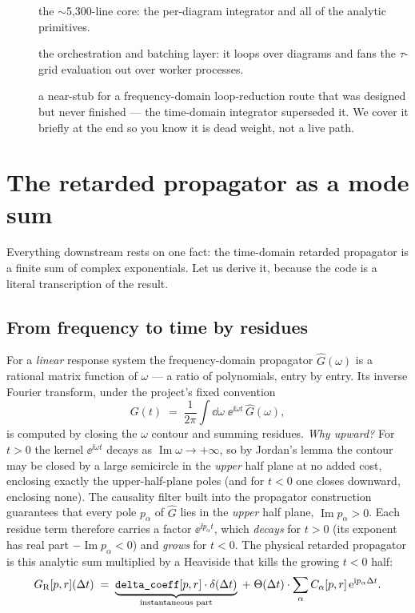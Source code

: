 \begin{description}
  \item[] the $\sim$5{,}300-line core: the per-diagram
        integrator and all of the analytic primitives.
  \item[] the orchestration and batching layer: it loops over
        diagrams and fans the $\tau$-grid evaluation out over worker processes.
  \item[] a near-stub for a frequency-domain loop-reduction
        route that was designed but never finished --- the time-domain integrator
        superseded it. We cover it briefly at the end so you know it is dead
        weight, not a live path.
\end{description}

\section{The retarded propagator as a mode sum}\label{sec:modesum}

Everything downstream rests on one fact: the time-domain retarded propagator is
a finite sum of complex exponentials. Let us derive it, because the code is a
literal transcription of the result.

\subsection{From frequency to time by residues}

For a \emph{linear} response system the frequency-domain propagator
$\widehat{G}(\omega)$ is a rational matrix function of $\omega$ --- a ratio of
polynomials, entry by entry. Its inverse Fourier transform, under the project's
fixed convention
\begin{equation}
  G(t) \;=\; \frac{1}{2\pi}\int \dd\omega \; \ee^{\ii \omega t}\,\widehat{G}(\omega),
  \label{eq:fourier-convention}
\end{equation}
is computed by closing the $\omega$ contour and summing residues. \emph{Why
upward?} For $t>0$ the kernel $\ee^{\ii\omega t}$ decays as
$\operatorname{Im}\omega\to+\infty$, so by Jordan's lemma the contour may be
closed by a large semicircle in the \emph{upper} half plane at no added cost,
enclosing exactly the upper-half-plane poles (and for $t<0$ one closes downward,
enclosing none). The causality
filter built into the propagator construction guarantees that every pole
$p_\alpha$ of $\widehat{G}$ lies in the \emph{upper} half plane,
$\operatorname{Im} p_\alpha > 0$. Each residue term therefore carries a factor
$\ee^{\ii p_\alpha t}$, which \emph{decays} for $t > 0$ (its exponent has real
part $-\operatorname{Im} p_\alpha < 0$) and \emph{grows} for $t < 0$. The
physical retarded propagator is this analytic sum multiplied by a Heaviside that
kills the growing $t<0$ half:
\begin{equation}
  G_{\mathrm R}[p, r](\Delta t)
   \;=\; \underbrace{\texttt{delta\_coeff}[p,r]\cdot\delta(\Delta t)}_{\text{instantaneous part}}
   \;+\; \Theta(\Delta t)\cdot\sum_\alpha C_\alpha[p,r]\,\mathrm{e}^{\mathrm{i} p_\alpha \Delta t}.
  \label{eq:GR-decomp}
\end{equation}

